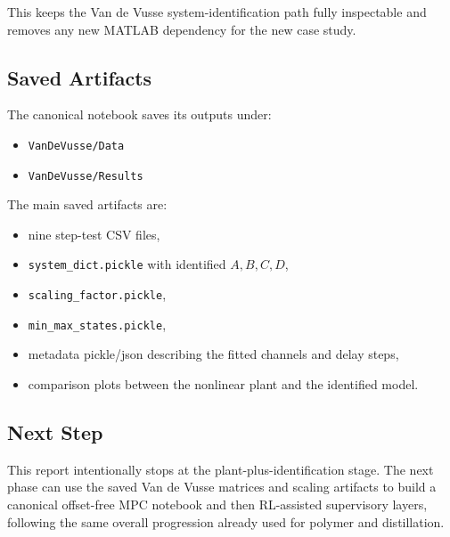 This keeps the Van de Vusse system-identification path fully inspectable and removes any new MATLAB dependency for the new case study.

\subsection{Saved Artifacts}

The canonical notebook saves its outputs under:
\begin{itemize}
    \item \texttt{VanDeVusse/Data}
    \item \texttt{VanDeVusse/Results}
\end{itemize}

The main saved artifacts are:
\begin{itemize}
    \item nine step-test CSV files,
    \item \texttt{system\_dict.pickle} with identified \(A, B, C, D\),
    \item \texttt{scaling\_factor.pickle},
    \item \texttt{min\_max\_states.pickle},
    \item metadata pickle/json describing the fitted channels and delay steps,
    \item comparison plots between the nonlinear plant and the identified model.
\end{itemize}

\subsection{Next Step}

This report intentionally stops at the plant-plus-identification stage. The next phase can use the saved Van de Vusse matrices and scaling artifacts to build a canonical offset-free MPC notebook and then RL-assisted supervisory layers, following the same overall progression already used for polymer and distillation.
